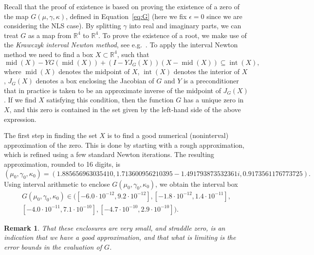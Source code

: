 \documentclass[11pt]{article}
\DeclareMathOperator{\midint}{mid}
\newtheorem{remark}[definition]{Remark}
\begin{document}
Recall that the proof of existence is based on proving the existence
of a zero of the map \(G(\mu, \gamma, \kappa)\), defined in
Equation~\eqref{eq:G} (here we fix \(\epsilon = 0\) since we are
considering the NLS case). By splitting \(\gamma\) into real and
imaginary parts, we can treat \(G\) as a map from \(\mathbb{R}^{4}\) to
\(\mathbb{R}^{4}\). To prove the existence of a root, we make use of the
\emph{Krawczyk interval Newton method}, see e.g.~\cite{Moore1977}. To
apply the interval Newton method we need to find a box
\(X \subset \mathbb{R}^{4}\), such that
\begin{equation}
  \label{eq:newton-condition}
  \midint(X) - YG(\midint(X)) + (I - YJ_{G}(X))(X - \midint(X)) \subseteq \operatorname{int}(X),
\end{equation}
where \(\midint(X)\) denotes the midpoint of \(X\),
\(\operatorname{int}(X)\) denotes the interior of \(X\), \(J_{G}(X)\)
denotes a box enclosing the Jacobian of \(G\) and \(Y\) is a
preconditioner that in practice is taken to be an approximate inverse
of the midpoint of \(J_{G}(X)\). If we find \(X\) satisfying this
condition, then the function \(G\) has a unique zero in \(X\), and
this zero is contained in the set given by the left-hand side of the
above expression.

The first step in finding the set \(X\) is to find a good numerical
(noninterval) approximation of the zero. This is done by starting with
a rough approximation, which is refined using a few standard Newton
iterations. The resulting approximation, rounded to 16 digits, is
\begin{equation}\label{eq:approximation}
  (\mu_{0}, \gamma_{0}, \kappa_{0}) =
  (1.885656963035410, 1.713600956210395 -1.491793873532361i, 0.9173561176773725).
\end{equation}
Using interval arithmetic to enclose
\(G(\mu_{0}, \gamma_{0}, \kappa_{0})\), we obtain the interval box
\begin{multline*}
  G(\mu_0, \gamma_0, \kappa_0) \in
  \big([-6.0 \cdot 10^{-12}, 9.2 \cdot 10^{-12}], [-1.8 \cdot 10^{-12}, 1.4 \cdot 10^{-11}],\\
  [-4.0 \cdot 10^{-11}, 7.1 \cdot 10^{-10}], [-4.7 \cdot 10^{-10}, 2.9 \cdot 10^{-10}]\big).
\end{multline*}

\begin{remark}
That these enclosures are very small, and straddle zero, is an
indication that we have a good approximation, and that what is
limiting is the error bounds in the evaluation of \(G\).
\end{remark}
\end{document}
